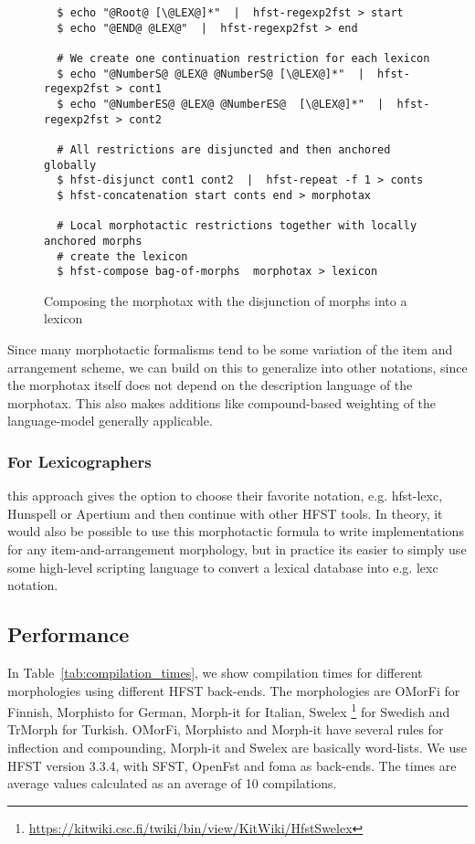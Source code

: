 \documentclass{llncs}
\begin{document}
\begin{figure} [h!]
\begin{verbatim}
  $ echo "@Root@ [\@LEX@]*"  |  hfst-regexp2fst > start
  $ echo "@END@ @LEX@"  |  hfst-regexp2fst > end

  # We create one continuation restriction for each lexicon
  $ echo "@NumberS@ @LEX@ @NumberS@ [\@LEX@]*"  |  hfst-regexp2fst > cont1
  $ echo "@NumberES@ @LEX@ @NumberES@  [\@LEX@]*"  |  hfst-regexp2fst > cont2

  # All restrictions are disjuncted and then anchored globally
  $ hfst-disjunct cont1 cont2  |  hfst-repeat -f 1 > conts
  $ hfst-concatenation start conts end > morphotax

  # Local morphotactic restrictions together with locally anchored morphs 
  # create the lexicon
  $ hfst-compose bag-of-morphs  morphotax > lexicon
\end{verbatim}
\caption{Composing the morphotax with the disjunction of morphs into a lexicon}
\label{fig:morphology2}
\end{figure}

Since many morphotactic formalisms tend to be some variation of the item and arrangement scheme,
we can build on this to generalize into other notations, since the morphotax itself
does not depend on the description language of the morphotax. 
This also makes additions like compound-based weighting of the language-model 
\cite{linden/2009/fsmnlp} generally applicable.

\subsubsection{For Lexicographers} this approach gives the option to
choose their favorite notation, e.g. hfst-lexc, Hunspell or Apertium and then continue with other
HFST tools. In theory, it would also be possible to use this morphotactic formula
to write implementations for any item-and-arrangement morphology, but in practice
its easier to simply use some high-level scripting language to convert a lexical database into 
e.g. lexc notation.

\subsection{Performance}

In Table~\ref{tab:compilation_times}, we show compilation times for different 
morphologies using different HFST back-ends. The morphologies are OMorFi 
\cite{pirinen/2008} for Finnish, Morphisto \cite{zielinski/2009} for German,
Morph-it \cite{Zanchetta/2005} for Italian, Swelex 
\footnote{\url{https://kitwiki.csc.fi/twiki/bin/view/KitWiki/HfstSwelex}} 
for Swedish and TrMorph \cite{Coltekin/2010} for Turkish. 
OMorFi, Morphisto and Morph-it have several rules for
inflection and compounding, Morph-it and Swelex are basically word-lists.
We use HFST version 3.3.4, with SFST, OpenFst and foma as
back-ends. The times are average values calculated as an average of 10 compilations.
\end{document}
